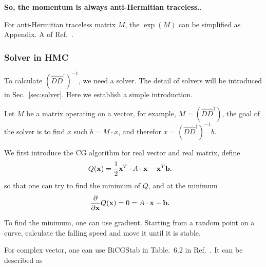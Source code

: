 \textbf{So, the momentum is always anti-Hermitian traceless.}.

For anti-Hermitian traceless matrix $M$, the $\exp(M)$ can be simplified as Appendix. A of Ref.~\cite{luscher2005}.

\subsubsection{\label{sec:Solver_In_HMC}Solver in HMC}

To calculate $(\hat{D}\hat{D}^{\dagger})^{-1}$, we need a solver. The detail of solvers will be introduced in Sec.~\ref{sec:solver}. Here we establish a simple introduction.

Let $M$ be a matrix operating on a vector, for example, $M=(\hat{D}\hat{D}^{\dagger})$, the goal of the solver is to find $x$ such $b=M\cdot x$, and therefor $x=(\hat{D}\hat{D}^{\dagger})^{-1}b$.

We first introduce the CG algorithm for real vector and real matrix, define
\begin{equation}
\begin{split}
&Q({\bf x})=\frac{1}{2}{\bf x}^T \cdot A \cdot {\bf x}-{\bf x}^T {\bf b}.
\end{split}
\end{equation}
so that one can try to find the minimum of $Q$, and at the minimum
\begin{equation}
\begin{split}
&\frac{\partial }{\partial {\bf x}}Q({\bf x})=0=A\cdot {\bf x}-{\bf b}.
\end{split}
\end{equation}

To find the minimum, one can use gradient. Starting from a random point on a curve, calculate the falling speed and move it until it is stable.

For complex vector, one can use BiCGStab in Table.~6.2 in Ref.~\cite{latticeqcdbook2010}. It can be described as


